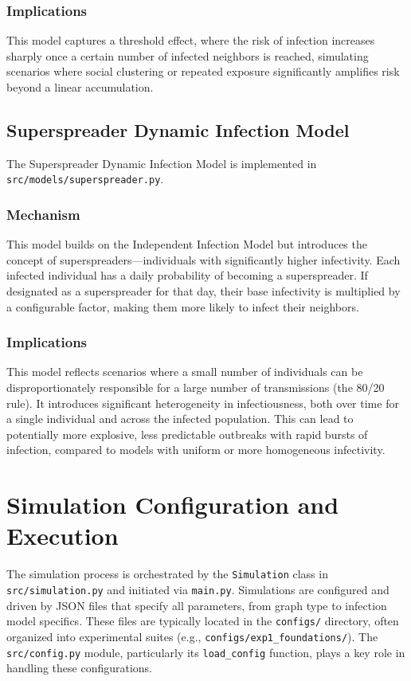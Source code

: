\documentclass[12pt]{article}
\begin{document}
\subsubsection{Implications}
This model captures a threshold effect, where the risk of infection increases sharply once a certain number of infected neighbors is reached, simulating scenarios where social clustering or repeated exposure significantly amplifies risk beyond a linear accumulation.

\subsection{Superspreader Dynamic Infection Model}
The Superspreader Dynamic Infection Model is implemented in \texttt{src/models/super\-spreader.py}.
\subsubsection{Mechanism}
This model builds on the Independent Infection Model but introduces the concept of superspreaders—individuals with significantly higher infectivity. Each infected individual has a daily probability of becoming a superspreader. If designated as a superspreader for that day, their base infectivity is multiplied by a configurable factor, making them more likely to infect their neighbors.
\subsubsection{Implications}
This model reflects scenarios where a small number of individuals can be disproportionately responsible for a large number of transmissions (the 80/20 rule). It introduces significant heterogeneity in infectiousness, both over time for a single individual and across the infected population. This can lead to potentially more explosive, less predictable outbreaks with rapid bursts of infection, compared to models with uniform or more homogeneous infectivity.

\section{Simulation Configuration and Execution}
The simulation process is orchestrated by the \texttt{Simulation} class in \texttt{src/simulation.py} and initiated via \texttt{main.py}. Simulations are configured and driven by JSON files that specify all parameters, from graph type to infection model specifics. These files are typically located in the \texttt{configs/} directory, often organized into experimental suites (e.g., \texttt{configs/exp1\_{}foun\-da\-tions/}). The \texttt{src/config.py} module, particularly its \texttt{load\_config} function, plays a key role in handling these configurations.
\end{document}
